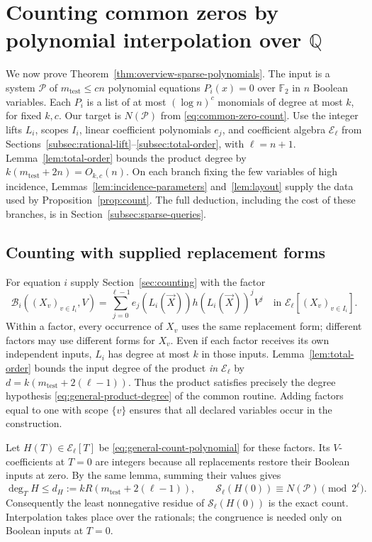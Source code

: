 \section{Counting common zeros by polynomial interpolation over \texorpdfstring{$\mathbb Q$}{Q}}\label{sec:setup}
We now prove Theorem~\ref{thm:overview-sparse-polynomials}. The input
is a system $\mathcal P$ of $m_{\mathrm{test}}\le cn$ polynomial equations
$P_i(x)=0$ over $\mathbb F_2$ in $n$ Boolean variables. Each $P_i$ is a
list of at most $(\log n)^c$ monomials of degree at most $k$, for fixed
$k,c$. Our target is $N(\mathcal P)$ from \eqref{eq:common-zero-count}.
Use the integer lifts $L_i$, scopes $I_i$, linear coefficient polynomials $e_j$,
and coefficient algebra $\mathcal E_\ell$ from
Sections~\ref{subsec:rational-lift}--\ref{subsec:total-order}, with
$\ell=n+1$. Lemma~\ref{lem:total-order} bounds the product degree by
$k(m_{\mathrm{test}}+2n)=O_{k,c}(n)$. On each branch fixing the few
variables of high incidence, Lemmas~\ref{lem:incidence-parameters}
and~\ref{lem:layout} supply the data used by Proposition~\ref{prop:count}.
The full deduction, including the cost of these branches, is in
Section~\ref{subsec:sparse-queries}.

\subsection{Counting with supplied replacement forms}\label{subsec:count-polynomial}
For equation $i$ supply Section~\ref{sec:counting} with the factor
\begin{equation}\label{eq:lifted-factor}
 \mathcal B_i((X_v)_{v\in I_i},V)
 =\sum_{j=0}^{\ell-1}e_j(L_i(\vec X))h(L_i(\vec X))^j V^j
 \quad\text{in }\mathcal E_\ell[(X_v)_{v\in I_i}].
\end{equation}
Within a factor, every occurrence of $X_v$ uses the same replacement
form; different factors may use different forms for $X_v$. Even if
each factor receives its own independent inputs, $L_i$ has degree at
most $k$ in those inputs. Lemma~\ref{lem:total-order} bounds the input
degree of the product \emph{in $\mathcal E_\ell$} by
$d=k(m_{\mathrm{test}}+2(\ell-1))$. Thus the product satisfies precisely
the degree hypothesis \eqref{eq:general-product-degree} of the common
routine. Adding factors equal to one with scope $\{v\}$ ensures that
all declared variables occur in the construction.

Let $H(T)\in\mathcal E_\ell[T]$ be \eqref{eq:general-count-polynomial}
for these factors. Its $V$-coefficients at $T=0$ are integers because
all replacements restore their Boolean inputs at zero. By the same
lemma, summing their values gives
\begin{equation}\label{eq:origin-residue}
 \deg_T H\le d_H:=kR(m_{\mathrm{test}}+2(\ell-1)),\qquad
 \mathcal S_\ell(H(0))\equiv N(\mathcal P)\pmod{2^\ell}.
\end{equation}
Consequently the least nonnegative residue of $\mathcal S_\ell(H(0))$
is the exact count. Interpolation takes place over the rationals;
the congruence is needed only on Boolean inputs at $T=0$.

